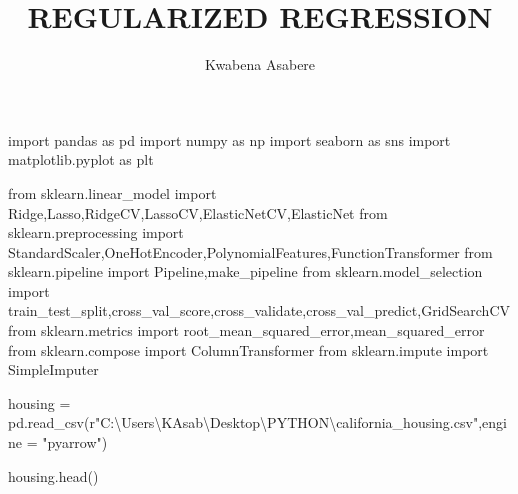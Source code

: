 \documentclass[
  letterpaper,
  DIV=11,
  numbers=noendperiod]{scrartcl}
\title{REGULARIZED REGRESSION}
\author{Kwabena Asabere}
\date{}
\newenvironment{Shaded}{\begin{snugshade}}{\end{snugshade}}
\newcommand{\ImportTok}[1]{\textcolor[rgb]{0.00,0.46,0.62}{#1}}
\newcommand{\NormalTok}[1]{\textcolor[rgb]{0.00,0.23,0.31}{#1}}
\newcommand{\OperatorTok}[1]{\textcolor[rgb]{0.37,0.37,0.37}{#1}}
\newcommand{\StringTok}[1]{\textcolor[rgb]{0.13,0.47,0.30}{#1}}
\newcommand{\VerbatimStringTok}[1]{\textcolor[rgb]{0.13,0.47,0.30}{#1}}
\begin{document}
\maketitle


\begin{Shaded}
\begin{Highlighting}[]
\ImportTok{import}\NormalTok{ pandas }\ImportTok{as}\NormalTok{ pd}
\ImportTok{import}\NormalTok{ numpy }\ImportTok{as}\NormalTok{ np}
\ImportTok{import}\NormalTok{ seaborn }\ImportTok{as}\NormalTok{ sns}
\ImportTok{import}\NormalTok{ matplotlib.pyplot }\ImportTok{as}\NormalTok{ plt}
\end{Highlighting}
\end{Shaded}

\begin{Shaded}
\begin{Highlighting}[]
\ImportTok{from}\NormalTok{ sklearn.linear\_model }\ImportTok{import}\NormalTok{ Ridge,Lasso,RidgeCV,LassoCV,ElasticNetCV,ElasticNet}
\ImportTok{from}\NormalTok{ sklearn.preprocessing }\ImportTok{import}\NormalTok{ StandardScaler,OneHotEncoder,PolynomialFeatures,FunctionTransformer}
\ImportTok{from}\NormalTok{ sklearn.pipeline }\ImportTok{import}\NormalTok{ Pipeline,make\_pipeline}
\ImportTok{from}\NormalTok{ sklearn.model\_selection }\ImportTok{import}\NormalTok{ train\_test\_split,cross\_val\_score,cross\_validate,cross\_val\_predict,GridSearchCV}
\ImportTok{from}\NormalTok{ sklearn.metrics }\ImportTok{import}\NormalTok{ root\_mean\_squared\_error,mean\_squared\_error}
\ImportTok{from}\NormalTok{ sklearn.compose }\ImportTok{import}\NormalTok{ ColumnTransformer}
\ImportTok{from}\NormalTok{ sklearn.impute }\ImportTok{import}\NormalTok{ SimpleImputer}
\end{Highlighting}
\end{Shaded}

\begin{Shaded}
\begin{Highlighting}[]
\NormalTok{housing }\OperatorTok{=}\NormalTok{ pd.read\_csv(}\VerbatimStringTok{r"C:\textbackslash{}Users\textbackslash{}KAsab\textbackslash{}Desktop\textbackslash{}PYTHON\textbackslash{}california\_housing.csv"}\NormalTok{,engine }\OperatorTok{=} \StringTok{"pyarrow"}\NormalTok{)}
\end{Highlighting}
\end{Shaded}

\begin{Shaded}
\begin{Highlighting}[]
\NormalTok{housing.head()}
\end{Highlighting}
\end{Shaded}
\end{document}
